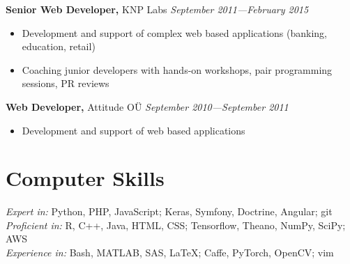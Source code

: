 \documentclass[margin,line]{res}
\begin{document}
\begin{resume}
{\bf Senior Web Developer,} KNP Labs \hfill {\it September 2011---February 2015}\\
\vspace*{-.1in}
\begin{itemize}
\item[ ] Development and support of complex web based applications (banking, education, retail)
\item[ ] Coaching junior developers with hands-on workshops, pair programming sessions, PR reviews 
\end{itemize}
\vspace*{-.05in}
{\bf Web Developer,} Attitude OÜ \hfill {\it September 2010---September 2011}\\
\vspace*{-.1in}
\begin{itemize}
\item[ ] Development and support of web based applications
\end{itemize}


\section{\sc Computer Skills}
{\it Expert in:} Python, PHP, JavaScript; Keras, Symfony, Doctrine, Angular; git
\vspace*{+.01in}\\
{\it Proficient in:} R, C++, Java, HTML, CSS; Tensorflow, Theano, NumPy, SciPy; AWS
\vspace*{+.01in}\\
{\it Experience in:} Bash, MATLAB, SAS, LaTeX; Caffe, PyTorch, OpenCV; vim



\end{resume}
\end{document}
